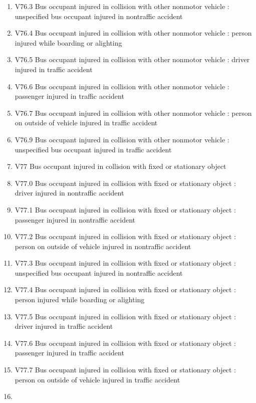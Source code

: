 \documentclass[
]{scrartcl}
\begin{document}
\begin{itemize}
\begin{enumerate}
  \item
    V76.3 Bus occupant injured in collision with other nonmotor vehicle
    : unspecified bus occupant injured in nontraffic accident
  \item
    V76.4 Bus occupant injured in collision with other nonmotor vehicle
    : person injured while boarding or alighting
  \item
    V76.5 Bus occupant injured in collision with other nonmotor vehicle
    : driver injured in traffic accident
  \item
    V76.6 Bus occupant injured in collision with other nonmotor vehicle
    : passenger injured in traffic accident
  \item
    V76.7 Bus occupant injured in collision with other nonmotor vehicle
    : person on outside of vehicle injured in traffic accident
  \item
    V76.9 Bus occupant injured in collision with other nonmotor vehicle
    : unspecified bus occupant injured in traffic accident
  \item
    V77 Bus occupant injured in collision with fixed or stationary
    object
  \item
    V77.0 Bus occupant injured in collision with fixed or stationary
    object : driver injured in nontraffic accident
  \item
    V77.1 Bus occupant injured in collision with fixed or stationary
    object : passenger injured in nontraffic accident
  \item
    V77.2 Bus occupant injured in collision with fixed or stationary
    object : person on outside of vehicle injured in nontraffic accident
  \item
    V77.3 Bus occupant injured in collision with fixed or stationary
    object : unspecified bus occupant injured in nontraffic accident
  \item
    V77.4 Bus occupant injured in collision with fixed or stationary
    object : person injured while boarding or alighting
  \item
    V77.5 Bus occupant injured in collision with fixed or stationary
    object : driver injured in traffic accident
  \item
    V77.6 Bus occupant injured in collision with fixed or stationary
    object : passenger injured in traffic accident
  \item
    V77.7 Bus occupant injured in collision with fixed or stationary
    object : person on outside of vehicle injured in traffic accident
  \item

\end{enumerate}
\end{itemize}
\end{document}
